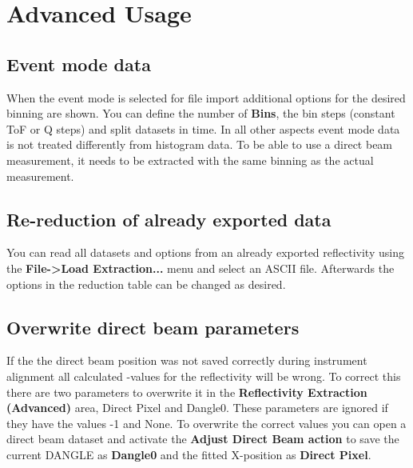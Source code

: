 \chapter{Advanced Usage}
\label{chap:advanced_usage}
  \section{Event mode data}
    When the event mode is selected for file import additional options for the desired binning are shown. You can define the number of \textbf{Bins}, the bin steps (constant ToF or Q steps) and split datasets in time.
    In all other aspects event mode data is not treated differently from histogram data. To be able to use a direct beam measurement, it needs to be extracted with the same binning as the actual measurement.
  
  \section{Re-reduction of already exported data}
    You can read all datasets and options from an already exported reflectivity using the \textbf{File->Load Extraction...} menu and select an ASCII file. 
    Afterwards the options in the reduction table can be changed as desired.

  \section{Overwrite direct beam parameters}
  \label{sec:overwrite}
    If the the direct beam position was not saved correctly during instrument alignment all calculated \Qz-values for the reflectivity will be wrong.
    To correct this there are two parameters to overwrite it in the \textbf{Reflectivity Extraction (Advanced)} area, Direct Pixel and Dangle0.
    These parameters are ignored if they have the values -1 and None.
    To overwrite the correct values you can open a direct beam dataset and activate the  \textbf{Adjust Direct Beam action}  to save the current DANGLE as \textbf{Dangle0} and the fitted X-position as \textbf{Direct Pixel}.
  
  \clearpage
